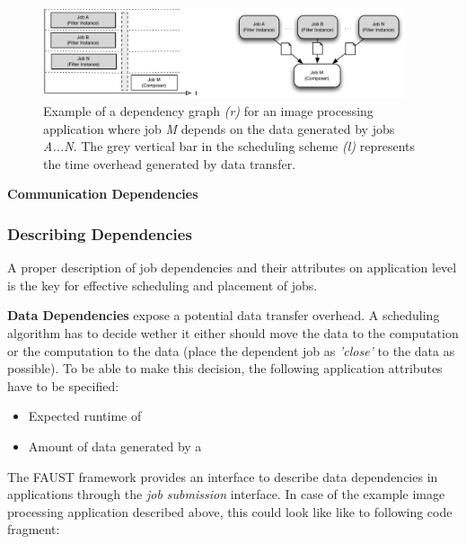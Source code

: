     \begin{figure}[h]
    \begin{center}
      \includegraphics[width=0.95\textwidth]{figures/data_dependencies}
      \caption{\label{fig:data_dependencies} Example of a dependency graph \textit{(r)} for an image processing application where job \textit{M} depends on the data generated by jobs \textit{A...N}. The grey vertical bar in the scheduling scheme \textit{(l)} represents the time overhead generated by data transfer.}
    \end{center}
  \end{figure}


\textbf{Communication Dependencies}

\subsubsection{Describing Dependencies}

A proper description of job dependencies and their attributes on application level is the key for effective scheduling and placement of jobs. 

\textbf{Data Dependencies} expose a potential data transfer overhead. A scheduling algorithm has to decide wether it either should move the data to the computation or the computation to the data (place the dependent job as \textit{'close'} to the data as possible). To be able to make this decision, the following application attributes have to be specified:

\begin{itemize}
\item Expected runtime of
\item Amount of data generated by a 
\end{itemize}

The FAUST framework provides an interface to describe data dependencies in applications through the \textit{job submission} interface. In case of the example image processing application described above, this could look like like to following code fragment:

